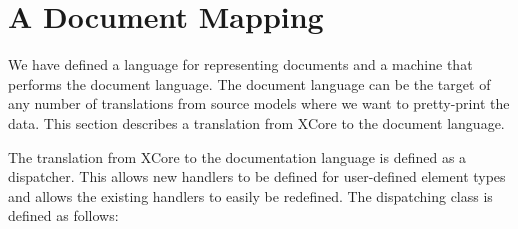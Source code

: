 \section{A Document Mapping}

We have defined a language for representing documents and a machine
that performs the document language. The document language can be
the target of any number of translations from source models where
we want to pretty-print the data. This section describes a translation
from XCore to the document language.

The translation from XCore to the documentation language is defined
as a dispatcher. This allows new handlers to be defined for user-defined
element types and allows the existing handlers to easily be redefined.
The dispatching class is defined as follows:

